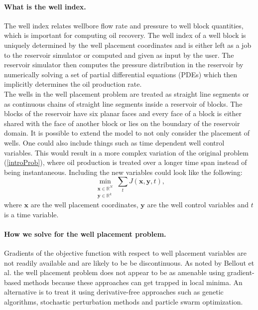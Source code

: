 \paragraph{What is the well index.}
%
The well index relates wellbore flow rate and
pressure to well block quantities\cite{Wolfsteiner},
which is important for computing oil recovery.
%
The well index of a well block is uniquely determined 
by the well placement coordinates and is either left as 
a job to the reservoir simulator or computed and given 
as input by the user. 
% 
The reservoir simulator then computes the pressure 
distribution in the reservoir by numerically solving 
a set of partial differential equations (PDEs) which 
then implicitly determines the oil production rate.\\
%
The wells in the well placement problem are treated
as straight line segments or as continuous chains of
straight line segments inside a reservoir of blocks.
%
The blocks of the reservoir have six planar faces and 
every face of a block is either shared with the face of 
another block or lies on the boundary of the reservoir 
domain.
%
%
It is possible to extend the model to not 
only consider the placement of wells. One
could also include things such as time dependent 
well control variables.
%
This would result in a more complex variation of 
the original problem (\ref{introProb}), where oil 
production is treated over a longer time span 
instead of being instantaneous. 
%
Including the new variables
could look like the following:
%
\begin{equation}
\min_{\substack{\textbf{x} \in \mathbb{R}^N\\\textbf{y} \in \mathbb{R}^k }} \sum_{t} J \left( \textbf{x},\textbf{y}, t \right),
\end{equation}
where $\textbf{x}$ are the well placement coordinates,
$\textbf{y}$ are the well control variables and $t$ is
a time variable.
%
\paragraph{How we solve for the well placement
problem.}
%
Gradients of the objective function with respect to well placement variables 
are not readily available and are likely to be be discontinuous. As noted by Bellout et al.
\cite{Bellout_paper} the well placement problem does not appear to be as amenable using gradient-based methods 
because these approaches can get trapped in local minima.
An alternative is to treat it using derivative-free approaches
such as genetic algorithms, stochastic perturbation methods and particle swarm optimization.
%
